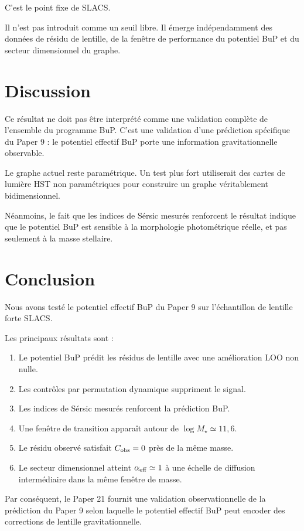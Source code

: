 \documentclass[11pt,a4paper]{article}
\begin{document}
C'est le point fixe de SLACS.

Il n'est pas introduit comme un seuil libre. Il émerge indépendamment des données de résidu de lentille, de la fenêtre de performance du potentiel BuP et du secteur dimensionnel du graphe.

\section{Discussion}

Ce résultat ne doit pas être interprété comme une validation complète de l'ensemble du programme BuP. C'est une validation d'une prédiction spécifique du Paper 9 : le potentiel effectif BuP porte une information gravitationnelle observable.

Le graphe actuel reste paramétrique. Un test plus fort utiliserait des cartes de lumière HST non paramétriques pour construire un graphe véritablement bidimensionnel.

Néanmoins, le fait que les indices de Sérsic mesurés renforcent le résultat indique que le potentiel BuP est sensible à la morphologie photométrique réelle, et pas seulement à la masse stellaire.

\section{Conclusion}

Nous avons testé le potentiel effectif BuP du Paper 9 sur l'échantillon de lentille forte SLACS.

Les principaux résultats sont :

\begin{enumerate}
\item Le potentiel BuP prédit les résidus de lentille avec une amélioration LOO non nulle.
\item Les contrôles par permutation dynamique suppriment le signal.
\item Les indices de Sérsic mesurés renforcent la prédiction BuP.
\item Une fenêtre de transition apparaît autour de \(\log M_\star\simeq11,6\).
\item Le résidu observé satisfait \(C_{\rm obs}=0\) près de la même masse.
\item Le secteur dimensionnel atteint \(\alpha_{\rm eff}\simeq1\) à une échelle de diffusion intermédiaire dans la même fenêtre de masse.
\end{enumerate}

Par conséquent, le Paper 21 fournit une validation observationnelle de la prédiction du Paper 9 selon laquelle le potentiel effectif BuP peut encoder des corrections de lentille gravitationnelle.



\end{document}
